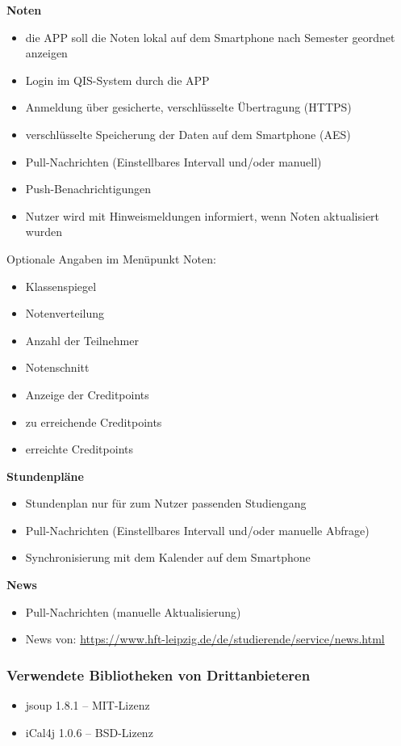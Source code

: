 \textbf{Noten}
\begin{itemize}
	\item die APP soll die Noten lokal auf dem Smartphone nach Semester geordnet anzeigen
	\item Login im \acs{QIS}-System durch die APP
	\item Anmeldung über gesicherte, verschlüsselte Übertragung (\acs{HTTPS})
	\item verschlüsselte Speicherung der Daten auf dem Smartphone (\acs{AES})
	\item Pull-Nachrichten (Einstellbares Intervall und/oder manuell)
	\item Push-Benachrichtigungen
	\item Nutzer wird mit Hinweismeldungen informiert, wenn Noten aktualisiert wurden
\end{itemize}
Optionale Angaben im Menüpunkt Noten:
\begin{itemize}
	\item Klassenspiegel
	\item Notenverteilung
	\item Anzahl der Teilnehmer
	\item Notenschnitt
	\item Anzeige der Creditpoints
	\item zu erreichende Creditpoints
	\item erreichte Creditpoints
\end{itemize}
\textbf{Stundenpläne}
\begin{itemize}
	\item Stundenplan nur für zum Nutzer passenden Studiengang
	\item Pull-Nachrichten (Einstellbares Intervall und/oder manuelle Abfrage)
	\item Synchronisierung mit dem Kalender auf dem Smartphone	
\end{itemize}
\textbf{News}
\begin{itemize}
	\item Pull-Nachrichten (manuelle Aktualisierung)
	\item News von: \url{https://www.hft-leipzig.de/de/studierende/service/news.html}
\end{itemize}



\subsubsection{Verwendete Bibliotheken von Drittanbieteren}
\begin{itemize}
	\item jsoup 1.8.1 – MIT-Lizenz
	\item iCal4j 1.0.6 – BSD-Lizenz 
\end{itemize}


